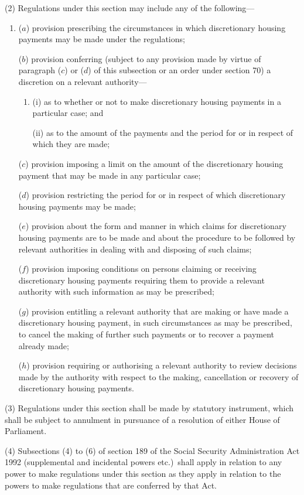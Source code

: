 \documentclass[12pt,a4paper]{article}
\begin{document}
(2) Regulations under this section may include any of the following—
\begin{enumerate}\item[]
($a$) provision prescribing the circumstances in which discretionary housing payments may be made under the regulations;

($b$) provision conferring (subject to any provision made by virtue of paragraph ($c$)  or ($d$)  of this subsection or an order under section 70) a discretion on a relevant authority—
\begin{enumerate}\item[]
(i) as to whether or not to make discretionary housing payments in a particular case; and

(ii) as to the amount of the payments and the period for or in respect of which they are made;
\end{enumerate}

($c$) provision imposing a limit on the amount of the discretionary housing payment that may be made in any particular case;

($d$) provision restricting the period for or in respect of which discretionary housing payments may be made;

($e$) provision about the form and manner in which claims for discretionary housing payments are to be made and about the procedure to be followed by relevant authorities in dealing with and disposing of such claims;

($f$) provision imposing conditions on persons claiming or receiving discretionary housing payments requiring them to provide a relevant authority with such information as may be prescribed;

($g$) provision entitling a relevant authority that are making or have made a discretionary housing payment, in such circumstances as may be prescribed, to cancel the making of further such payments or to recover a payment already made;

($h$) provision requiring or authorising a relevant authority to review decisions made by the authority with respect to the making, cancellation or recovery of discretionary housing payments.
\end{enumerate}

(3) Regulations under this section shall be made by statutory instrument, which shall be subject to annulment in pursuance of a resolution of either House of Parliament.

(4) Subsections (4)  to (6)  of section 189 of the Social Security Administration Act 1992 (supplemental and incidental powers etc.)\ shall apply in relation to any power to make regulations under this section as they apply in relation to the powers to make regulations that are conferred by that Act.
\end{document}
